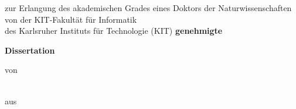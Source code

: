 \begin{titlepage}
\thispagestyle{empty}
\setlength{\unitlength}{1pt}


\newcommand{\tpsb}{\vskip 2.8cm}
\newcommand{\tpss}{\vskip 1.0cm}
\newcommand{\tpsm}{\vskip 0.5cm}



\begin{center}
\hbox{}

{\huge\bfseries \mytitle \par}
\tpss
zur Erlangung des akademischen Grades eines
\tpss
{\Large
Doktors der Naturwissenschaften
}
\tpss
von der KIT-Fakultät für Informatik \\
des Karlsruher Instituts für Technologie (KIT)
\tpss
\textbf{genehmigte} \\
\begin{large}\textbf{Dissertation}\end{large}
\tpsm
von
\tpsm
\begin{large}\textbf{\myname}\end{large} \\
aus \mycity
\tpss




\end{center}
\end{titlepage}

